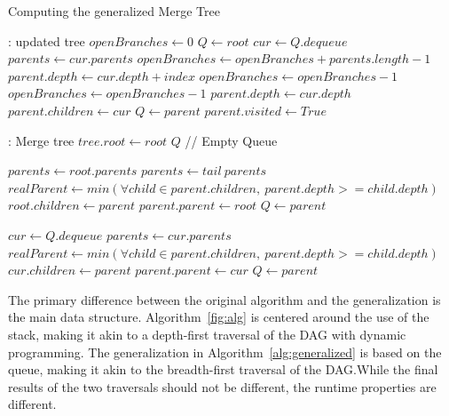\begin{algorithm}
  \caption{Computing the generalized Merge Tree}
  \label{alg:generalized}
  \begin{algorithmic}[1]
     : updated tree
    \State $openBranches \gets 0$
    \State $Q \gets root$
    \Do
    \State $cur \gets Q.dequeue$
    \State $parents \gets cur.parents$
    \State $openBranches \gets openBranches + parents.length - 1$
    \State $parent.depth \gets cur.depth + index$
    \State $openBranches \gets openBranches - 1$
    \State $openBranches \gets openBranches - 1$
    \State $parent.depth \gets cur.depth$
    \EndIf
    \State $parent.children \gets cur$
    \State $Q \gets parent$
    \State $parent.visited \gets True$
    \EndIf
    \EndFor
    \EndFunction

     : Merge tree
    \State $tree.root \gets root$
    \State $Q$ // Empty Queue

    \State $parents \gets root.parents$
    \State $parents \gets tail\ parents$
    \State $realParent \gets min(\forall child \in parent.children,\ parent.depth >= child.depth)$
    \State $root.children \gets parent$
    \State $parent.parent \gets root$
    \State $Q \gets parent$
    \EndIf
    \EndFor

    \State $cur \gets Q.dequeue$
    \State $parents \gets cur.parents$
    \State $realParent \gets min(\forall child \in parent.children,\ parent.depth >= child.depth)$
    \State $cur.children \gets parent$
    \State $parent.parent \gets cur$
    \State $Q \gets parent$
    \EndIf

    \EndFor
    \EndWhile

    \EndFunction
  \end{algorithmic}
\end{algorithm}

The primary difference between the original algorithm and the
generalization is the main data structure. Algorithm~\ref{fig:alg}
is centered around the use of the stack, making it akin to a depth-first
traversal of the DAG with dynamic programming. The generalization in
Algorithm~\ref{alg:generalized} is based on the queue, making it akin to
the breadth-first traversal of the DAG.\@ While the final results of the
two traversals should not be different, the runtime properties are
different.

